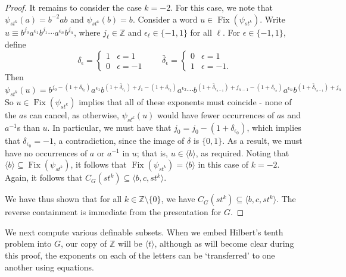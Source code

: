 \documentclass[11pt]{amsart}
\theoremstyle{definition}
\numberwithin{theorem}{section}
\DeclareMathOperator{\Fix}{Fix}
\newcommand{\Z}{\mathbb{Z}}
\begin{document}
\begin{proof}
It remains to consider the case \(k = -2\). For this case, we note that
		\(\psi_{st^k}(a) = b^{-2} ab\) and \(\psi_{st^k}(b) = b\). Consider a
		word \(u \in \Fix(\psi_{st^k})\). Write \(u \equiv b^{j_0}
		a^{\epsilon_1} b^{j_1} \cdots a^{\epsilon_n} b^{j_n}\), where \(j_\ell
		\in \Z\) and \(\epsilon_\ell \in \{-1, 1\}\) for all
		\(\ell\). For \(\epsilon \in \{-1, 1\}\), define
		\[
				\delta_\epsilon = \begin{cases}
						1 & \epsilon = 1 \\
						0 & \epsilon = -1
				\end{cases}
				\qquad
				\bar{\delta}_\epsilon = \begin{cases}
						0 & \epsilon = 1 \\
						1 & \epsilon = -1.
				\end{cases}
		\]
		Then 
		\[
				\psi_{st^k}(u) = b^{j_0 - (1 + \delta_{\epsilon_0})}
				a^{\epsilon_1} 
				b^{(1 + \bar{\delta}_{\epsilon_1}) + j_1 - (1 + \delta_{\epsilon_2})}
				a^{\epsilon_2} 
				\cdots
				b^{(1 + \bar{\delta}_{\epsilon_{n - 1}}) + j_{n - 1} - (1 + \delta_{\epsilon_n})}
				a^{\epsilon_n}
				b^{(1 + \bar{\delta}_{\epsilon_{n - 1}}) + j_n}
		\]
		So \(u \in \Fix(\psi_{st^k})\) implies that all of these exponents must
		coincide - none of the \(a\)s can cancel, as otherwise, \(\psi_{st^k}(u)\)
		would have fewer occurrences of \(a\)s and \(a^{-1}\)s than \(u\).
		In particular, we must have that \(j_0 = j_0 -(1 + \delta_{\epsilon_0})\),
		which implies that \(\delta_{\epsilon_0} = -1\), a contradiction, since
		the image of \(\delta\) is \(\{0, 1\}\). As a result, we must have no
		occurrences of \(a\) or \(a^{-1}\) in \(u\); that is, \(u \in \langle
		b \rangle\), as required. Noting that \(\langle b \rangle \subseteq
		\Fix(\psi_{st^k})\), it follows that \(\Fix(\psi_{st^k}) = \langle
		b \rangle\) in this case of \(k = -2\). Again, it follows that
		\(C_G(st^k) \subseteq \langle b,c,  st^k \rangle\).

		We have thus shown that for all \(k \in \Z \setminus \{0\}\), we have
		\(C_G(st^k) \subseteq \langle b,c, st^k \rangle\). The reverse
		containment is immediate from the presentation for \(G\).
	\end{proof}

	We next compute various definable subsets. When we embed Hilbert's tenth
	problem into \(G\), our copy of \(\Z\) will be \(\langle t \rangle\),
	although as will become clear during this proof, the exponents on each
	of the letters can be `transferred' to one another using equations.
\end{document}

